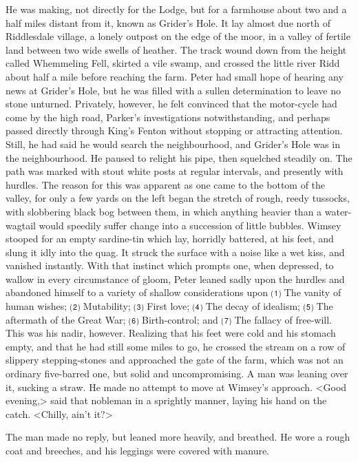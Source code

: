 He was making, not directly for the Lodge, but for a farmhouse about two and a half miles distant from it, known as Grider's Hole. It lay almost due north of Riddlesdale village, a lonely outpost on the edge of the moor, in a valley of fertile land between two wide swells of heather. The track wound down from the height called Whemmeling Fell, skirted a vile swamp, and crossed the little river Ridd about half a mile before reaching the farm. Peter had small hope of hearing any news at Grider's Hole, but he was filled with a sullen determination to leave no stone unturned. Privately, however, he felt convinced that the motor-cycle had come by the high road, Parker's investigations notwithstanding, and perhaps passed directly through King's Fenton without stopping or attracting attention. Still, he had said he would search the neighbourhood, and Grider's Hole was in the neighbourhood. He paused to relight his pipe, then squelched steadily on. The path was marked with stout white posts at regular intervals, and presently with hurdles. The reason for this was apparent as one came to the bottom of the valley, for only a few yards on the left began the stretch of rough, reedy tussocks, with slobbering black bog between them, in which anything heavier than a water-wagtail would speedily suffer change into a succession of little bubbles. Wimsey stooped for an empty sardine-tin which lay, horridly battered, at his feet, and slung it idly into the quag. It struck the surface with a noise like a wet kiss, and vanished instantly. With that instinct which prompts one, when depressed, to wallow in every circumstance of gloom, Peter leaned sadly upon the hurdles and abandoned himself to a variety of shallow considerations upon ⑴ The vanity of human wishes; ⑵ Mutability; ⑶ First love; ⑷ The decay of idealism; ⑸ The aftermath of the Great War; ⑹ Birth-control; and ⑺ The fallacy of free-will. This was his nadir, however. Realizing that his feet were cold and his stomach empty, and that he had still some miles to go, he crossed the stream on a row of slippery stepping-stones and approached the gate of the farm, which was not an ordinary five-barred one, but solid and uncompromising. A man was leaning over it, sucking a straw. He made no attempt to move at Wimsey's approach. <Good evening,> said that nobleman in a sprightly manner, laying his hand on the catch. <Chilly, ain't it?>

The man made no reply, but leaned more heavily, and breathed. He wore a rough coat and breeches, and his leggings were covered with manure.

